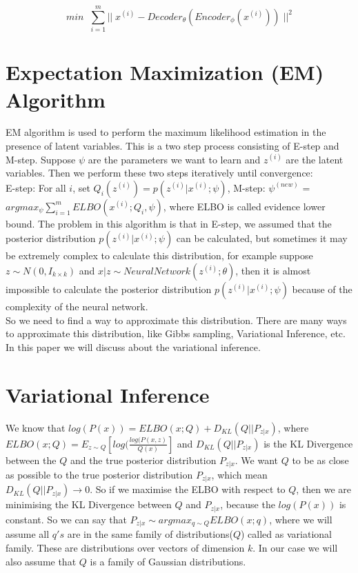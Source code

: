 \documentclass[10pt,a4paper]{article}
\begin{document}
\[
  min \;\; \sum_{i=1}^{m} ||\;  x^{(i)} - Decoder_{\theta}(Encoder_{\phi}(x^{(i)})) \; ||^2
\]

\section{Expectation Maximization (EM) Algorithm}
EM algorithm is used to perform the maximum likelihood estimation in the presence of latent variables. This is a two step process consisting of E-step and M-step. Suppose $\psi$ are the parameters we want to learn and $z^{(i)}$ are the latent variables. Then we perform these two steps iteratively until convergence: \\
E-step: For all $i$, set $Q_i(z^{(i)}) = p(z^{(i)}|x^{(i)}; \psi)$, M-step: $\psi^{(new)}$ = $argmax_{\psi} \sum_{i=1}^{m} ELBO(x^{(i)};Q_i,\psi)$, where ELBO is called evidence lower bound. The problem in this algorithm is that in E-step, we assumed that the posterior distribution $p(z^{(i)}|x^{(i)}; \psi)$  can be calculated, but sometimes it may be extremely complex to calculate this distribution, for example suppose $z \sim N(0,I_{k \times k})$ and $x | z \sim NeuralNetwork(z^{(i)};\theta)$, then it is almost impossible to calculate the posterior distribution $p(z^{(i)}|x^{(i)}; \psi)$ because of the complexity of the neural network.
\\ So we need to find a way to approximate this distribution. There are many ways to approximate this distribution, like Gibbs sampling, Variational Inference, etc. In this paper we will discuss about the variational inference.

\section{Variational Inference}
We know that $log(P(x)) = ELBO(x;Q) + D_{KL}(Q || P_{z|x})$, where $ELBO(x;Q) = E_{z \sim Q} [log(\frac{log(P(x,z)}{Q(x)}]$ and $D_{KL}(Q || P_{z|x})$ is the KL Divergence between the $Q$ and the true posterior distribution $P_{z|x}$. We want $Q$ to be as close as possible to the true posterior distribution $P_{z|x}$, which mean $D_{KL}(Q || P_{z|x}) \longrightarrow 0$. So if we maximise the ELBO with respect to $Q$, then we are minimising the KL Divergence between $Q$ and $P_{z|x}$, because the $log(P(x))$ is constant. So we can say that $P_{z|x} \sim argmax_{q \sim Q} ELBO(x;q)$, where we will assume all $q's$ are in the same family of distributions($Q$) called as variational family. These are distributions over vectors of dimension $k$. In our case we will also assume that $Q$ is a family of Gaussian distributions.
\end{document}

